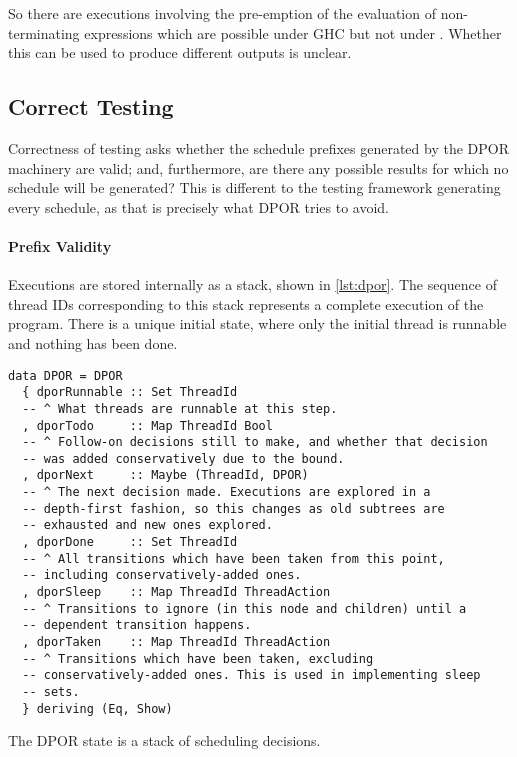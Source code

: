 So there are executions involving the pre-emption of the evaluation of
non-terminating expressions which are possible under GHC but not under
\dejafu{}.  Whether this can be used to produce different outputs is
unclear.

\subsection{Correct Testing}

Correctness of testing asks whether the schedule prefixes generated by
the DPOR machinery are valid; and, furthermore, are there any possible
results for which no schedule will be generated?  This is different to
the testing framework generating every schedule, as that is precisely
what DPOR tries to avoid.

\paragraph{Prefix Validity}
Executions are stored internally as a stack, shown in \cref{lst:dpor}.
The sequence of thread IDs corresponding to this stack represents a
complete execution of the program.  There is a unique initial state,
where only the initial thread is runnable and nothing has been done.

\begin{listing}
  \begin{verbatim}
data DPOR = DPOR
  { dporRunnable :: Set ThreadId
  -- ^ What threads are runnable at this step.
  , dporTodo     :: Map ThreadId Bool
  -- ^ Follow-on decisions still to make, and whether that decision
  -- was added conservatively due to the bound.
  , dporNext     :: Maybe (ThreadId, DPOR)
  -- ^ The next decision made. Executions are explored in a
  -- depth-first fashion, so this changes as old subtrees are
  -- exhausted and new ones explored.
  , dporDone     :: Set ThreadId
  -- ^ All transitions which have been taken from this point,
  -- including conservatively-added ones.
  , dporSleep    :: Map ThreadId ThreadAction
  -- ^ Transitions to ignore (in this node and children) until a
  -- dependent transition happens.
  , dporTaken    :: Map ThreadId ThreadAction
  -- ^ Transitions which have been taken, excluding
  -- conservatively-added ones. This is used in implementing sleep
  -- sets.
  } deriving (Eq, Show)
  \end{verbatim}
  \caption[The \dejafu{} DPOR state.]{The DPOR state is a stack of scheduling decisions.}\label{lst:dpor}
\end{listing}


